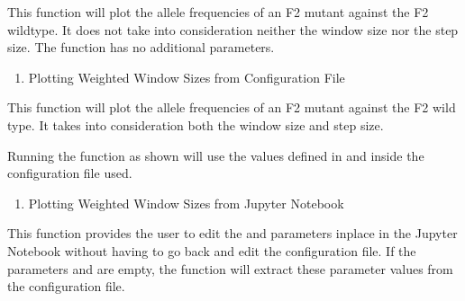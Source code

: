 \documentclass[letterpaper,10pt,english]{sphinxhowto}
\begin{document}
\sphinxAtStartPar
This function will plot the allele frequencies of an F2 mutant against the F2 wild\sphinxhyphen{}type. It does not take into consideration neither the window size nor the step size. The function has no additional parameters.
\begin{enumerate}
%
\setcounter{enumi}{1}
\item {} 
\sphinxAtStartPar
Plotting Weighted Window Sizes from Configuration File

\end{enumerate}

\begin{sphinxVerbatim}[commandchars=\\\{\}]
 \PYG{p}{[} \PYG{p}{]} 
\end{sphinxVerbatim}

\sphinxAtStartPar
This function will plot the allele frequencies of an F2 mutant against the F2 wild type. It takes into consideration both the window size and step size.

\sphinxAtStartPar
Running the function as shown will use the values defined in  and  inside the configuration file used.
\begin{enumerate}
%
\setcounter{enumi}{2}
\item {} 
\sphinxAtStartPar
Plotting Weighted Window Sizes from Jupyter Notebook

\end{enumerate}

\begin{sphinxVerbatim}[commandchars=\\\{\}]
 \PYG{p}{[} \PYG{p}{]}     
\end{sphinxVerbatim}

\sphinxAtStartPar
This function provides the user to edit the  and  parameters in\sphinxhyphen{}place in the Jupyter Notebook without having to go back and edit the configuration file. If the parameters  and  are empty, the function will extract these parameter values from the configuration file.
\end{document}
